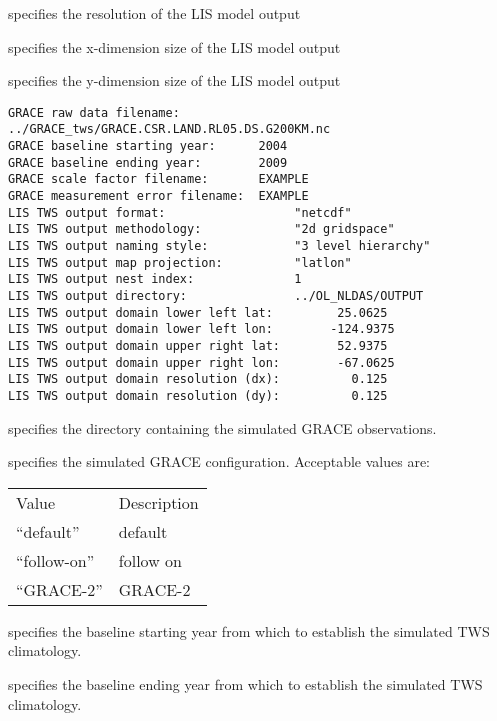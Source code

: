 specifies the resolution of the LIS model output

 specifies the x-dimension size of the LIS model output

 specifies the y-dimension size of the LIS model output

 

 \begin{Verbatim}[frame=single]
GRACE raw data filename:    ../GRACE_tws/GRACE.CSR.LAND.RL05.DS.G200KM.nc
GRACE baseline starting year:      2004
GRACE baseline ending year:        2009
GRACE scale factor filename:       EXAMPLE
GRACE measurement error filename:  EXAMPLE
LIS TWS output format:                  "netcdf"
LIS TWS output methodology:             "2d gridspace"
LIS TWS output naming style:            "3 level hierarchy"
LIS TWS output map projection:          "latlon"
LIS TWS output nest index:              1
LIS TWS output directory:               ../OL_NLDAS/OUTPUT
LIS TWS output domain lower left lat:         25.0625
LIS TWS output domain lower left lon:        -124.9375
LIS TWS output domain upper right lat:        52.9375
LIS TWS output domain upper right lon:        -67.0625
LIS TWS output domain resolution (dx):          0.125
LIS TWS output domain resolution (dy):          0.125
 \end{Verbatim}

 
  specifies the directory
 containing the simulated GRACE observations.

  specifies the simulated GRACE
 configuration.
 Acceptable values are:

 \begin{tabular}{ll}
 Value         & Description \\
 ``default''   & default     \\
 ``follow-on'' & follow on   \\
 ``GRACE-2''   & GRACE-2     \\
 \end{tabular}

 specifies the baseline starting year from which to establish the 
 simulated TWS climatology.

 specifies the baseline ending year from which to establish the
 simulated TWS climatology.


